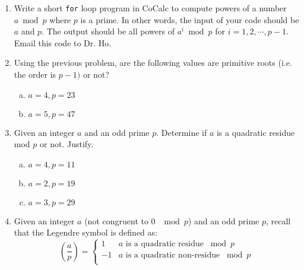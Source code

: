 \documentclass[12pt]{amsart}
\theoremstyle{plain}
\theoremstyle{definition}
\begin{document}
\begin{enumerate}[1.]
\item Write a short \texttt{for} loop program in CoCalc to compute powers of a number $a \bmod p$ where $p$ is a prime. In other words, the input of your code should be $a$ and $p$.  The output should be all powers of $a^i \bmod p$ for $i = 1, 2, \cdots, p-1$.  Email this code to Dr. Ho.\\
\item Using the previous problem, are the following values are primitive roots (i.e. the order is $p-1)$ or not?
	\begin{enumerate}[a.]
	\item $a = 4, p = 23$
    	\begin{framed}
    	\vspace{.3in}
		\end{framed}
    \item $a = 5, p = 47$
    	\begin{framed}
    	\vspace{.3in}
		\end{framed}
    \end{enumerate}
\item Given an integer $a$ and an odd prime $p$.  Determine if $a$ is a quadratic residue mod $p$ or not.  Justify.
	\begin{enumerate}[a.]
		\item $a = 4, p = 11$
		\begin{framed}
		\vspace{.5in}
		\end{framed}
		\item $a = 2, p = 19$
		\begin{framed}
		\vspace{.5in}
		\end{framed}
		\item $a = 3, p = 29$
		\begin{framed}
		\vspace{.5in}
		\end{framed}
	\end{enumerate}
	\item Given an integer $a$ (not congruent to 0 $\mod p$) and an odd prime $p$, recall that the Legendre symbol is defined as: 
	\[ \left( \frac{a}{p}\right) = \begin{cases} 
      1 & a \text{ is a quadratic residue } \bmod p \\
      -1 & a \text{ is a quadratic non-residue } \bmod p \\

\end{cases}\]
\end{enumerate}
\end{document}
